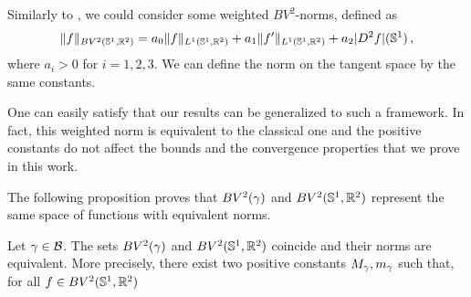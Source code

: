 \begin{rem} Similarly to \cite{Bruveris}, we could consider some weighted $BV^2$-norms, defined as
$$\|f\|_{BV^2(\mathbb{S}^1,\mathbb{R}^2)} = a_0\|f\|_{L^1(\mathbb{S}^1,{\mathbb R}^2)} +a_1\|f'\|_{L^1(\mathbb{S}^1,{\mathbb R}^2)} + a_2|D^2 f|(\mathbb{S}^1)\,,$$
where $a_i>0$ for $i=1,2,3$.
We can define the norm on the tangent space by the same constants.

One can easily satisfy that our results can be generalized to such a framework. In fact, this weighted norm is equivalent to the classical one and  the positive constants do not affect the bounds and the convergence properties that we prove in this work.
\end{rem}

The following proposition proves that $BV^2(\gamma)$ and $BV^2(\mathbb{S}^1,\mathbb{R}^2)$ represent the same space of functions with equivalent norms. 

\begin{prop}\label{equiv-norms}
Let $\gamma \in \mathcal{B}$. 
The sets $BV^2(\gamma)$ and $BV^2(\mathbb{S}^1,{\mathbb R}^2)$ coincide and their norms are equivalent.
More precisely, there exist two positive constants $M_\gamma, m_\gamma$  such that, for all $f \in BV^2(\mathbb{S}^1,{\mathbb R}^2)$
\end{prop}


